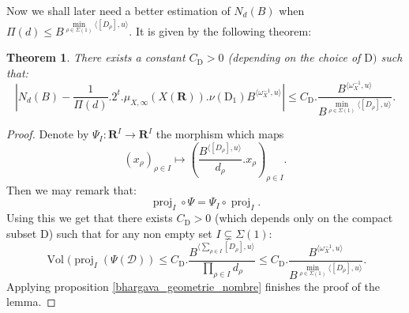 \documentclass{proc-l}
\newcommand{\R}{\mathbf{R}}
\newcommand{\Z}{\mathbf{Z}}
\DeclareMathOperator{\proj}{proj}
\DeclareMathOperator{\Vol}{Vol}
\newcommand{\stackT}{\mathcal{T}}
\newcommand{\w}{\omega}
\newtheorem{theorem}{Theorem}[section]
\newtheorem{prop}[theorem]{Proposition}
\theoremstyle{definition}
\theoremstyle{remark}
\numberwithin{equation}{section}
\begin{document}
Now we shall later need a better estimation of $N_d(B)$ when $\Pi(d) \leqslant B^{\min\limits_{\rho \in \Sigma(1)} \langle [D_{\rho}] , u \rangle}$. It is given by the following theorem:


\begin{theorem}\label{estimation_N_d(B)}
    There exists a constant $C_{\mathrm{D}} > 0$ (depending on the choice of $\mathrm{D})$ such that:
    $$\left|  N_d(B) - \frac{1}{\Pi(d)}.2^t.\mu_{X,\infty}(X(\R)). \nu(\mathrm{D}_1) B^{ \langle \w_{X}^{-1} , u \rangle } \right| \leqslant C_{\mathrm{D}} .\frac{B^{\langle \w_X^{-1},u\rangle}}{B^{ \min\limits_{\rho \in \Sigma(1)} \langle [D_{\rho}],u\rangle } } .$$
\end{theorem}

\begin{proof}
    Denote by $\Psi_I : \R^I \rightarrow \R^I$ the morphism which maps $$(x_{\rho})_{\rho \in I} \mapsto \left( \frac{B^{\langle [D_{\rho}] , u \rangle}}{d_{\rho}} . x_{\rho} \right)_{\rho \in I} .$$Then we may remark that:
  $$ \proj_I \circ \Psi = \Psi_I \circ \proj_I .$$Using this we get that there exists $C_{\mathrm{D}} > 0$ (which depends only on the compact subset $\mathrm{D}$) such that for any non empty set $I \subsetneq \Sigma(1) $:
   $$ \Vol(\proj_I(\Psi(\mathcal{D})) \leqslant C_{\mathrm{D}} . \frac{B^{\langle \sum\limits_{\rho \in I} [D_{\rho}] , u \rangle}}{\prod\limits_{ \rho \in I} d_{\rho}} \leqslant C_{\mathrm{D}}.\frac{B^{\langle \w_X^{-1},u\rangle}}{B^{ \min\limits_{\rho \in \Sigma(1)} \langle [D_{\rho}],u\rangle } }.$$Applying proposition \ref{bhargava_geometrie_nombre} finishes the proof of the lemma.
   
\end{proof}



\end{document}
